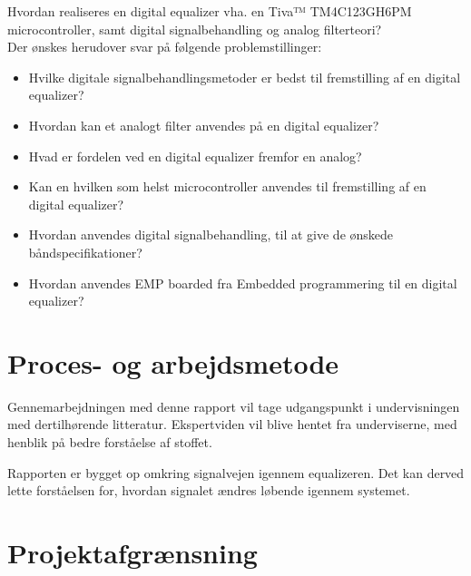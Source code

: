Hvordan realiseres en digital equalizer vha. en Tiva™ TM4C123GH6PM microcontroller, samt digital signalbehandling og analog filterteori?\\

Der ønskes herudover svar på følgende problemstillinger:
\begin{itemize}
	\item Hvilke digitale signalbehandlingsmetoder er bedst til fremstilling af en digital equalizer?
	\item Hvordan kan et analogt filter anvendes på en digital equalizer?
	\item Hvad er fordelen ved en digital equalizer fremfor en analog?
	\item Kan en hvilken som helst microcontroller anvendes til fremstilling af en digital equalizer?
	\item Hvordan anvendes digital signalbehandling, til at give de ønskede båndspecifikationer?
	\item Hvordan anvendes EMP boarded fra Embedded programmering til en digital equalizer?
\end{itemize}


\section{Proces- og arbejdsmetode}

Gennemarbejdningen med denne rapport vil tage udgangspunkt i undervisningen med dertilhørende litteratur. Ekspertviden vil blive hentet fra underviserne, med henblik på bedre forståelse af stoffet.

Rapporten er bygget op omkring signalvejen igennem equalizeren. Det kan derved lette forståelsen for, hvordan signalet ændres løbende igennem systemet.


\section{Projektafgrænsning}

